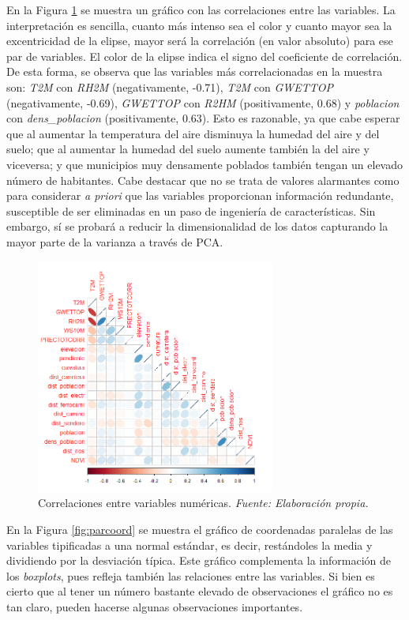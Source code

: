 \documentclass[12pt,a4paper,]{book}
\numberwithin{dummy}{section}
\theoremstyle{ocrenumbox}
\theoremstyle{blacknumex}
\theoremstyle{blacknumbox}
\theoremstyle{ocrenum}
\theoremstyle{ocrenum}
\begin{document}
En la Figura \ref{fig:corrplot} se muestra un gráfico con las
correlaciones entre las variables. La interpretación es sencilla, cuanto
más intenso sea el color y cuanto mayor sea la excentricidad de la
elipse, mayor será la correlación (en valor absoluto) para ese par de
variables. El color de la elipse indica el signo del coeficiente de
correlación. De esta forma, se observa que las variables más
correlacionadas en la muestra son: \emph{T2M} con \emph{RH2M}
(negativamente, -0.71), \emph{T2M} con \emph{GWETTOP} (negativamente,
-0.69), \emph{GWETTOP} con \emph{R2HM} (positivamente, 0.68) y
\emph{poblacion} con \emph{dens\_poblacion} (positivamente, 0.63). Esto
es razonable, ya que cabe esperar que al aumentar la temperatura del
aire disminuya la humedad del aire y del suelo; que al aumentar la
humedad del suelo aumente también la del aire y viceversa; y que
municipios muy densamente poblados también tengan un elevado número de
habitantes. Cabe destacar que no se trata de valores alarmantes como
para considerar \emph{a priori} que las variables proporcionan
información redundante, susceptible de ser eliminadas en un paso de
ingeniería de características. Sin embargo, sí se probará a reducir la
dimensionalidad de los datos capturando la mayor parte de la varianza a
través de PCA.

\begin{figure}[h]
\centering
\includegraphics[width =0.7\textwidth]{graficos/corrplot.png}
\caption[Correlaciones entre variables numéricas]{Correlaciones entre variables numéricas. \it Fuente: Elaboración propia.}
\label{fig:corrplot}
\end{figure}

En la Figura \ref{fig:parcoord} se muestra el gráfico de coordenadas
paralelas de las variables tipificadas a una normal estándar, es decir,
restándoles la media y dividiendo por la desviación típica. Este gráfico
complementa la información de los \emph{boxplots}, pues refleja también
las relaciones entre las variables. Si bien es cierto que al tener un
número bastante elevado de observaciones el gráfico no es tan claro,
pueden hacerse algunas observaciones importantes.
\end{document}
